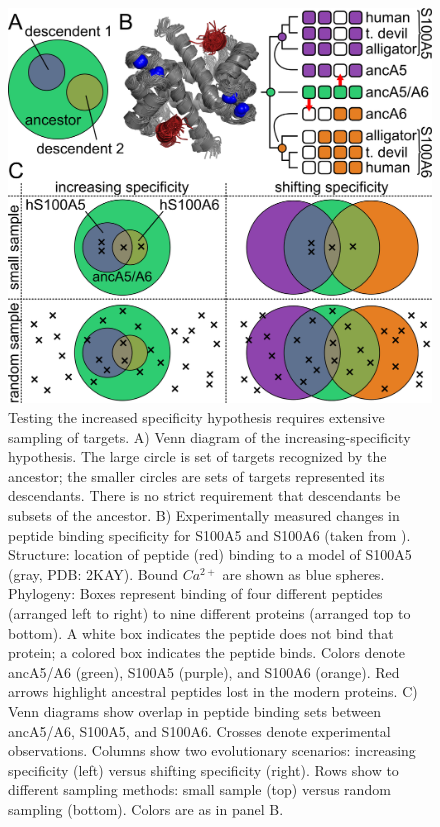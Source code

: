 \begin{figure} %
\centering
	\includegraphics{ch6-fig1.png} 
\caption[Testing the increased specificity hypothesis requires
extensive\newline sampling of targets]{Testing the increased specificity hypothesis requires
extensive sampling of targets. A) Venn diagram of the increasing-specificity
hypothesis. The large circle is set of targets recognized by the ancestor;
the smaller circles are sets of targets represented its descendants.
There is no strict requirement that descendants be subsets of the
ancestor. B) Experimentally measured changes in peptide binding specificity
for S100A5 and S100A6 (taken from \citep{wheeler_conservation_2017}).
Structure: location of peptide (red) binding to a model of S100A5
(gray, PDB: 2KAY). Bound $Ca^{2+}$ are shown as blue spheres. Phylogeny:
Boxes represent binding of four different peptides (arranged left
to right) to nine different proteins (arranged top to bottom). A white
box indicates the peptide does not bind that protein; a colored box
indicates the peptide binds. Colors denote ancA5/A6 (green), S100A5
(purple), and S100A6 (orange). Red arrows highlight ancestral peptides
lost in the modern proteins. C) Venn diagrams show overlap in peptide
binding sets between ancA5/A6, S100A5, and S100A6. Crosses denote
experimental observations. Columns show two evolutionary scenarios:
increasing specificity (left) versus shifting specificity (right).
Rows show to different sampling methods: small sample (top) versus
random sampling (bottom). Colors are as in panel B. \label{samplefigure}}	
\end{figure}

